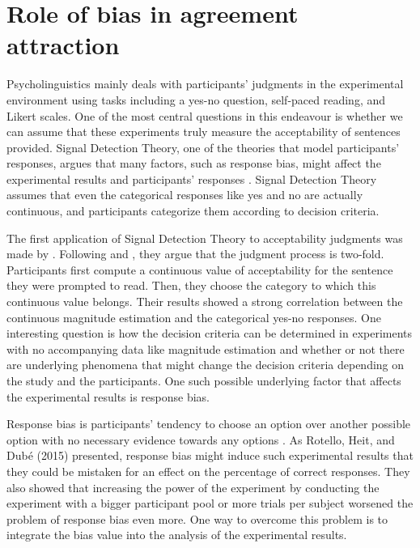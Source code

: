 \section{Role of bias in agreement attraction} \label{sec:bias_aa}

Psycholinguistics mainly deals with participants' judgments in the experimental environment using tasks including a yes-no question, self-paced reading, and Likert scales. One of the most central questions in this endeavour is whether we can assume that these experiments truly measure the acceptability of sentences provided. Signal Detection Theory, one of the theories that model participants' responses, argues that many factors, such as response bias, might affect the experimental results and participants' responses \citep{MacmillanCreelman2005}. Signal Detection Theory assumes that even the categorical responses like yes and no are actually continuous, and participants categorize them according to decision criteria. 

The first application of Signal Detection Theory to acceptability judgments was made by . Following  and , they argue that the judgment process is two-fold. Participants first compute a continuous value of acceptability for the sentence they were prompted to read. Then, they choose the category to which this continuous value belongs. Their results showed a strong correlation between the continuous magnitude estimation and the categorical yes-no responses. One interesting question is how the decision criteria can be determined in experiments with no accompanying data like magnitude estimation and whether or not there are underlying phenomena that might change the decision criteria depending on the study and the participants. One such possible underlying factor that affects the experimental results is response bias.

Response bias is participants' tendency to choose an option over another possible option with no necessary evidence towards any options \citep{MacmillanCreelman2005}. As Rotello, Heit, and Dub{\'e} (2015) presented, response bias might induce such experimental results that they could be mistaken for an effect on the percentage of correct responses. They also showed that increasing the power of the experiment by conducting the experiment with a bigger participant pool or more trials per subject worsened the problem of response bias even more. One way to overcome this problem is to integrate the bias value into the analysis of the experimental results. 

